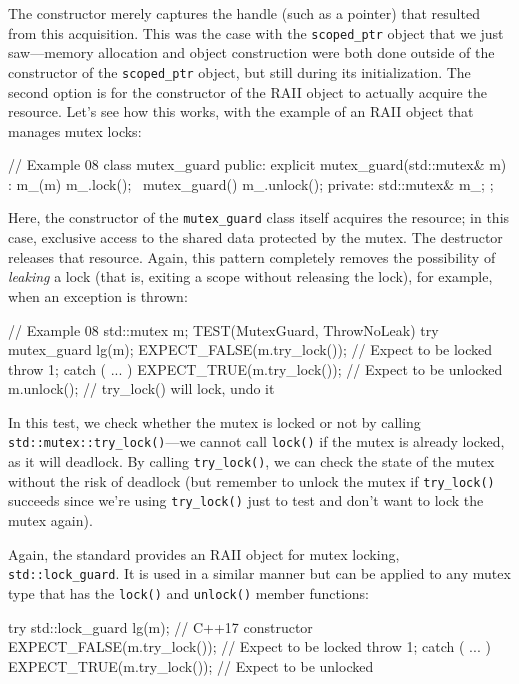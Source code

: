 The constructor merely captures the handle (such as a pointer) that resulted from this acquisition. This was the case with the \texttt{scoped\_ptr} object that we just saw---memory allocation and object construction were both done outside of the constructor of the \texttt{scoped\_ptr} object, but still during its initialization. The second option is for the constructor of the RAII object to actually acquire the resource. Let's see how this works, with the example of an RAII object that manages mutex locks:

\begin{code}
// Example 08
class mutex_guard {
  public:
  explicit mutex_guard(std::mutex& m) : m_(m) {
    m_.lock();
  }
  ~mutex_guard() { m_.unlock(); }
  private:
  std::mutex& m_;
};
\end{code}

Here, the constructor of the \texttt{mutex\_guard} class itself acquires the resource; in this case, exclusive access to the shared data protected by the mutex. The destructor releases that resource. Again, this pattern completely removes the possibility of \emph{leaking} a lock (that is, exiting a scope without releasing the lock), for example, when an exception is thrown:

\begin{code}
// Example 08
std::mutex m;
TEST(MutexGuard, ThrowNoLeak) {
  try {
    mutex_guard lg(m);
    EXPECT_FALSE(m.try_lock());    // Expect to be locked
    throw 1;
  } catch ( ... ) {}
  EXPECT_TRUE(m.try_lock());    // Expect to be unlocked
  m.unlock();    // try_lock() will lock, undo it
}
\end{code}

In this test, we check whether the mutex is locked or not by calling \texttt{std::mutex::try\_lock()}---we cannot call \texttt{lock()} if the mutex is already locked, as it will deadlock. By calling \texttt{try\_lock()}, we can check the state of the mutex without the risk of deadlock (but remember to unlock the mutex if \texttt{try\_lock()} succeeds since we're using \texttt{try\_lock()} just to test and don't want to lock the mutex again).

Again, the standard provides an RAII object for mutex locking, \texttt{std::lock\_guard}. It is used in a similar manner but can be applied to any mutex type that has the \texttt{lock()} and \texttt{unlock()} member functions:

\begin{code}
  try {
    std::lock_guard lg(m);        // C++17 constructor
    EXPECT_FALSE(m.try_lock());    // Expect to be locked
    throw 1;
  } catch ( ... ) {}
  EXPECT_TRUE(m.try_lock());    // Expect to be unlocked
\end{code}

